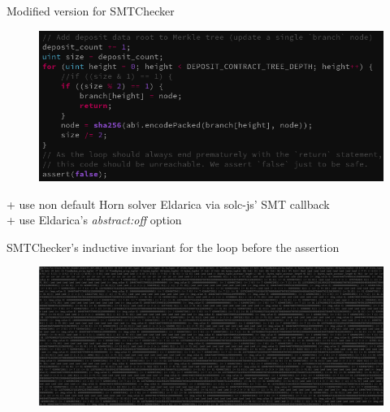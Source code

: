 \documentclass[aspectratio=169,10pt]{beamer}
\begin{document}
\begin{frame}[fragile]
\begin{center}
Modified version for SMTChecker
\begin{figure}
\includegraphics[scale=0.25]{images/deposit_smtchecker_code}
\end{figure}
+ use non default Horn solver Eldarica via solc-js' SMT callback\\
+ use Eldarica's \emph{abstract:off} option
\end{center}
\end{frame}

\begin{frame}[fragile]
\begin{center}
SMTChecker's inductive invariant for the loop before the assertion
\begin{figure}
\includegraphics[scale=0.2]{images/deposit_pass_smtchecker_proof}
\end{figure}
\end{center}
\end{frame}
\end{document}
